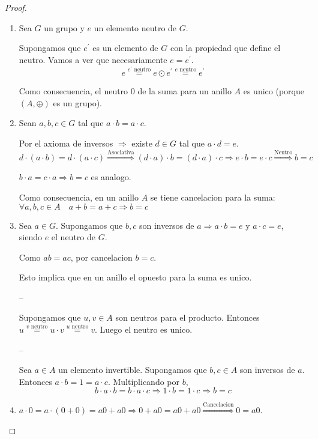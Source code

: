 \begin{proof}
	\begin{enumerate}
		\item Sea \(G \) un grupo y \(e \) un elemento neutro de \(G \).
		      
		      Supongamos que \(e^\prime  \) es un elemento de \(G \) con la propiedad que define el neutro. Vamos a ver que necesariamente \(e = e^\prime \).
		      \[
			      e \overset{e^\prime \text{ neutro}}{=} e \odot e^\prime \overset{e\text{ neutro}}{=} e^\prime
		      \]
		      \begin{remark}
			      Como consecuencia, el neutro 0 de la suma para un anillo \(A \) es unico (porque \((A, \oplus )\) es un grupo).
		      \end{remark}
		\item Sean \(a,b,c \in G \) tal que \(a \cdot b = a \cdot c \).
		      
		      Por el axioma de inversos \(\Rightarrow \) existe \(d \in G \) tal que \(a \cdot d = e \).
		      \[
			      d \cdot (a \cdot b ) = d \cdot (a \cdot c) \overset{\text{Asociativa}}{\Rightarrow} (d\cdot a) \cdot b = (d \cdot a) \cdot c \Rightarrow e \cdot b = e \cdot c \overset{\text{Neutro}}{\Rightarrow} b = c
		      \]
		      
		      \(b \cdot a = c \cdot a \Rightarrow b = c \) es analogo.
		      \begin{remark}
			      Como consecuencia, en un anillo \(A \) se tiene cancelacion para la suma: \(\forall a,b,c \in A \quad a + b = a + c \Rightarrow b = c\)
		      \end{remark}
		\item Sea \(a \in G \). Supongamos que \(b,c\) son inversos de \(a \Rightarrow a \cdot b = e \) y \(a \cdot c = e \), siendo \(e \) el neutro de \(G \).
		      
		      Como \(ab = ac \), por cancelacion \(b = c \).
		      \begin{remark}
			      Esto implica que en un anillo el opuesto para la suma es unico.
		      \end{remark}
		      --
		      
		      Supongamos que \(u,v \in A \) son neutros para el producto. Entonces \(u \overset{v \text{ neutro} }{=} u \cdot v \overset{u \text{ neutro} }{=} v\). Luego el neutro es unico.
		      
		      --
		      
		      Sea \(a \in A \) un elemento invertible. Supongamos que \(b,c \in A \) son inversos de \(a \). Entonces \(a \cdot b = 1 = a \cdot c \). Multiplicando por \(b \),
		      \[
			      b \cdot a \cdot b = b \cdot a \cdot c \Rightarrow 1 \cdot b = 1 \cdot c \Rightarrow b = c
		      \]
		      
		\item \(a \cdot 0 = a \cdot (0+0) = a0 + a0 \Rightarrow 0 + a0 = a0 + a0 \overset{\text{Cancelacion} }{\Rightarrow} 0 = a0\).
	\end{enumerate}
\end{proof}


